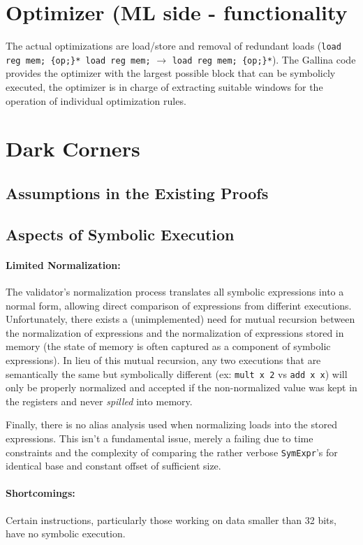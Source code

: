 \documentclass{article}
\begin{document}
\section{Optimizer (ML side - functionality}
The actual optimizations are load/store and removal of redundant loads
({\tt load reg mem; \{op;\}* load reg mem;} $\rightarrow$ {\tt load reg
  mem; \{op;\}*}).  The Gallina code provides the optimizer with the
largest possible block that can be symbolicly executed, the optimizer
is in charge of extracting suitable windows for the operation of
individual optimization rules.

\section{Dark Corners}

\subsection{Assumptions in the Existing Proofs}


\subsection{Aspects of Symbolic Execution}
\paragraph{Limited Normalization: }The validator's normalization
process translates all symbolic expressions into a normal form,
allowing direct comparison of expressions from differint executions.
Unfortunately, there exists a (unimplemented) need for mutual
recursion between the normalization of expressions and the
normalization of expressions stored in memory (the state of memory is
often captured as a component of symbolic expressions).  In lieu of
this mutual recursion, any two executions that are semantically the
same but symbolically different (ex: {\tt mult x 2} vs {\tt add x x})
will only be properly normalized and accepted if the non-normalized
value was kept in the registers and never {\it spilled} into memory.

Finally, there is no alias analysis used when normalizing loads into
the stored expressions.  This isn't a fundamental issue, merely a
failing due to time constraints and the complexity of comparing the
rather verbose {\tt SymExpr}'s for identical base and constant offset
of sufficient size.

\paragraph{Shortcomings: }
Certain instructions, particularly those working on data
smaller than 32 bits, have no symbolic execution.
\end{document}
